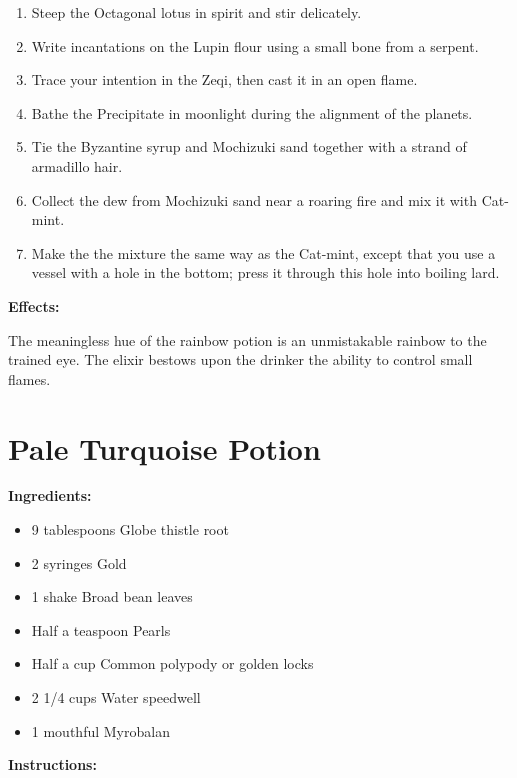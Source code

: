 \documentclass{article}
\begin{document}
\begin{enumerate}
  \item Steep the Octagonal lotus in spirit and stir delicately.
  \item Write incantations on the Lupin flour using a small bone from a serpent.
  \item Trace your intention in the Zeqi, then cast it in an open flame.
  \item Bathe the Precipitate in moonlight during the alignment of the planets.
  \item Tie the Byzantine syrup and Mochizuki sand together with a strand of armadillo hair.
  \item Collect the dew from Mochizuki sand near a roaring fire and mix it with Cat-mint.
  \item Make the the mixture the same way as the Cat-mint, except that you use a vessel with a hole in the bottom; press it through this hole into boiling lard.
\end{enumerate}

\textbf{Effects:}

The meaningless hue of the rainbow potion is an unmistakable rainbow to the trained eye. The elixir bestows upon the drinker the ability to control small flames.

\newpage
\section*{Pale Turquoise Potion}

\textbf{Ingredients:}

\begin{itemize}
  \item 9 tablespoons Globe thistle root
  \item 2 syringes Gold
  \item 1 shake Broad bean leaves
  \item Half a teaspoon Pearls
  \item Half a cup Common polypody or golden locks
  \item 2 1/4 cups Water speedwell
  \item 1 mouthful Myrobalan
\end{itemize}

\textbf{Instructions:}
\end{document}
